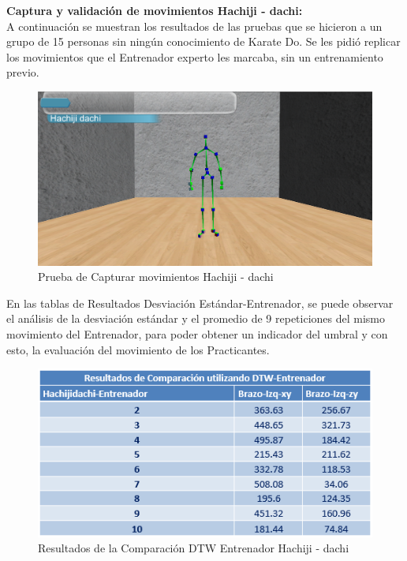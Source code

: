 \clearpage
\textbf{Captura y validación de movimientos Hachiji - dachi:}\\
A continuación se muestran los resultados de las pruebas que se hicieron a un grupo de 15 personas sin ningún conocimiento de Karate Do. Se les pidió replicar los movimientos que el Entrenador experto les marcaba, sin un entrenamiento previo.\\
\begin{figure}[H]%
	\begin{center}
		\includegraphics[scale=0.50]{./Figuras/Implementacion/Pruebas/Prueba_Capturar_movimientos}
	\end{center}
	\caption{Prueba de Capturar movimientos Hachiji - dachi}
	\label{fig:Prueba_Capturar_movimientos}
\end{figure}
En las tablas de Resultados Desviación Estándar-Entrenador, se puede observar el análisis de la desviación estándar y el promedio de 9 repeticiones del mismo movimiento del Entrenador, para poder obtener un indicador del umbral y con esto, la evaluación del movimiento de los Practicantes.
\begin{figure}[H]%
	\begin{center}
		\includegraphics[scale=1]{./Figuras/Implementacion/Pruebas/Tablas/ResultadosDTW_Entrenador_Hachijidachi}
	\end{center}
	\caption{Resultados de la Comparación DTW Entrenador Hachiji - dachi}
	\label{fig:ResultadosDTW_Entrenador_Hachijidachi}
\end{figure}
